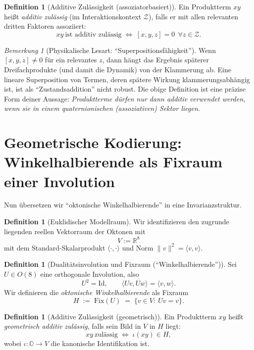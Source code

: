 \documentclass[11pt,a4paper]{article}
\theoremstyle{definition}
\newtheorem{definition}[satz]{Definition}
\theoremstyle{remark}
\newtheorem{bemerkung}[satz]{Bemerkung}
\begin{document}
	\begin{definition}[Additive Zulässigkeit (assoziatorbasiert)]
		Ein Produktterm $xy$ heißt \emph{additiv zulässig} (im Interaktionskontext $\mathcal Z$),
		falls er mit allen relevanten dritten Faktoren assoziiert:
		\[
		\boxed{\;\;xy\ \text{ist additiv zulässig}\;\Longleftrightarrow\;
			[x,y,z]=0\ \ \forall z\in\mathcal Z.\;\;}
		\]
	\end{definition}
	
	\begin{bemerkung}[Physikalische Lesart: ``Superpositionsfähigkeit'']
		Wenn $[x,y,z]\neq 0$ für ein relevantes $z$, dann hängt das Ergebnis späterer
		Dreifachprodukte (und damit die Dynamik) von der Klammerung ab.
		Eine lineare Superposition von Termen, deren spätere Wirkung klammerungsabhängig ist,
		ist als ``Zustandsaddition'' nicht robust.
		Die obige Definition ist eine präzise Form deiner Aussage:
		\emph{Produktterme dürfen nur dann additiv verwendet werden, wenn sie in einem
			quaternionischen (assoziativen) Sektor liegen.}
	\end{bemerkung}
	
	\section{Geometrische Kodierung: Winkelhalbierende als Fixraum einer Involution}
	Nun übersetzen wir ``oktonische Winkelhalbierende'' in eine Invarianzstruktur.
	
	\begin{definition}[Euklidischer Modellraum]
		Wir identifizieren den zugrunde liegenden reellen Vektorraum der Oktonen mit
		\[
		V:=\mathbb R^8
		\]
		mit dem Standard-Skalarprodukt $\langle \cdot,\cdot\rangle$ und Norm
		$\|v\|^2=\langle v,v\rangle$.
	\end{definition}
	
	\begin{definition}[Dualitätsinvolution und Fixraum (``Winkelhalbierende'')]
		Sei $U\in O(8)$ eine orthogonale Involution, also
		\[
		U^2=\mathrm{Id},\qquad \langle Uv,Uw\rangle=\langle v,w\rangle.
		\]
		Wir definieren die \emph{oktonische Winkelhalbierende} als Fixraum
		\[
		H\;:=\;\mathrm{Fix}(U)\;=\;\{v\in V:\ Uv=v\}.
		\]
	\end{definition}
	
	\begin{definition}[Additive Zulässigkeit (geometrisch)]
		Ein Produktterm $xy$ heißt \emph{geometrisch additiv zulässig}, falls sein Bild in $V$
		in $H$ liegt:
		\[
		\boxed{\;\;xy\ \text{zulässig}\;\Longleftrightarrow\; \iota(xy)\in H,\;\;}
		\]
		wobei $\iota:\mathbb O\to V$ die kanonische Identifikation ist.
	\end{definition}
	
\end{document}
